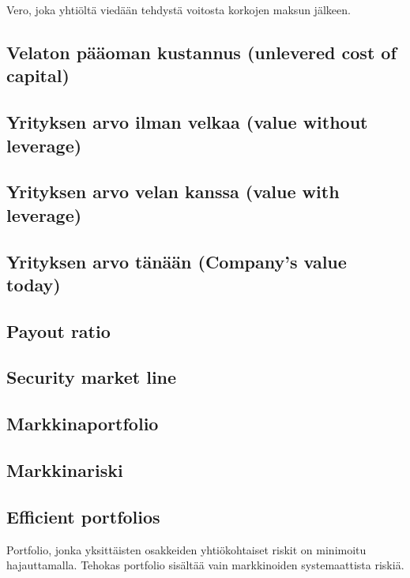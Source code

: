 \documentclass[a4paper]{article}
\begin{document}
Vero, joka yhtiöltä viedään tehdystä voitosta korkojen maksun jälkeen.

\subsection{Velaton pääoman kustannus (unlevered cost of capital)}

\subsection{Yrityksen arvo ilman velkaa (value without leverage)}

\subsection{Yrityksen arvo velan kanssa (value with leverage)}


\subsection{Yrityksen arvo tänään (Company's value today)}

\subsection{Payout ratio}

\subsection{Security market line}

\subsection{Markkinaportfolio}

\subsection{Markkinariski}

\subsection{Efficient portfolios}

Portfolio, jonka yksittäisten osakkeiden yhtiökohtaiset riskit on minimoitu hajauttamalla. Tehokas portfolio sisältää vain markkinoiden systemaattista riskiä.
\end{document}
